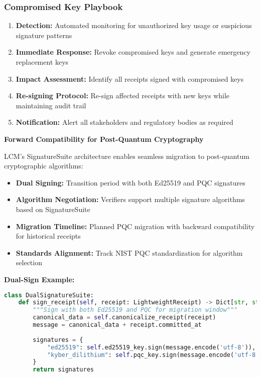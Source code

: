 \documentclass[12pt,a4paper]{article}
\begin{document}
\subsubsection{Compromised Key Playbook}

\begin{enumerate}
\item \textbf{Detection:} Automated monitoring for unauthorized key usage or suspicious signature patterns
\item \textbf{Immediate Response:} Revoke compromised keys and generate emergency replacement keys
\item \textbf{Impact Assessment:} Identify all receipts signed with compromised keys
\item \textbf{Re-signing Protocol:} Re-sign affected receipts with new keys while maintaining audit trail
\item \textbf{Notification:} Alert all stakeholders and regulatory bodies as required
\end{enumerate}

\begin{technicalbox}
\textbf{Forward Compatibility for Post-Quantum Cryptography}

LCM's SignatureSuite architecture enables seamless migration to post-quantum cryptographic algorithms:

\begin{itemize}
\item \textbf{Dual Signing:} Transition period with both Ed25519 and PQC signatures
\item \textbf{Algorithm Negotiation:} Verifiers support multiple signature algorithms based on SignatureSuite
\item \textbf{Migration Timeline:} Planned PQC migration with backward compatibility for historical receipts
\item \textbf{Standards Alignment:} Track NIST PQC standardization for algorithm selection
\end{itemize}

\textbf{Dual-Sign Example:}
\begin{lstlisting}[language=Python, caption=Post-Quantum Migration]
class DualSignatureSuite:
    def sign_receipt(self, receipt: LightweightReceipt) -> Dict[str, str]:
        """Sign with both Ed25519 and PQC for migration window"""
        canonical_data = self.canonicalize_receipt(receipt)
        message = canonical_data + receipt.committed_at
        
        signatures = {
            "ed25519": self.ed25519_key.sign(message.encode('utf-8')),
            "kyber_dilithium": self.pqc_key.sign(message.encode('utf-8'))
        }
        return signatures
\end{lstlisting}
\end{technicalbox}
\end{document}
